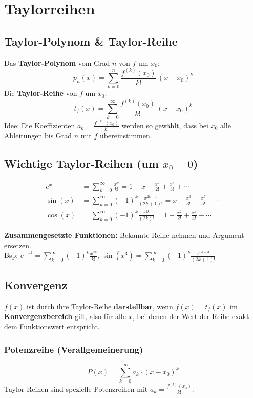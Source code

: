 \section{Taylorreihen}

\subsection{Taylor-Polynom \& Taylor-Reihe}
Das \textbf{Taylor-Polynom} vom Grad \(n\) von \(f\) um \(x_0\):
\[
    p_n(x) = \sum_{k=0}^{n} \frac{f^{(k)}(x_0)}{k!}\,(x-x_0)^k
\]
Die \textbf{Taylor-Reihe} von \(f\) um \(x_0\):
\[
    t_f(x) = \sum_{k=0}^{\infty} \frac{f^{(k)}(x_0)}{k!}\,(x-x_0)^k
\]
Idee: Die Koeffizienten \(a_k = \frac{f^{(k)}(x_0)}{k!}\) werden so gewählt, dass bei \(x_0\) alle Ableitungen bis Grad \(n\) mit \(f\) übereinstimmen.

\subsection{Wichtige Taylor-Reihen (um \texorpdfstring{$x_0=0$}{x0=0})}
\begin{align*}
    e^x     & = \sum_{k=0}^{\infty} \frac{x^k}{k!} = 1 + x + \frac{x^2}{2!} + \frac{x^3}{3!} + \cdots              \\
    \sin(x) & = \sum_{k=0}^{\infty} (-1)^k \frac{x^{2k+1}}{(2k+1)!} = x - \frac{x^3}{3!} + \frac{x^5}{5!} - \cdots \\
    \cos(x) & = \sum_{k=0}^{\infty} (-1)^k \frac{x^{2k}}{(2k)!} = 1 - \frac{x^2}{2!} + \frac{x^4}{4!} - \cdots
\end{align*}

\textbf{Zusammengesetzte Funktionen:} Bekannte Reihe nehmen und Argument ersetzen.\\
Bsp: \(e^{-x^2} = \sum_{k=0}^{\infty} (-1)^k \frac{x^{2k}}{k!}\), \enspace \(\sin(x^3) = \sum_{k=0}^{\infty} (-1)^k \frac{x^{6k+3}}{(2k+1)!}\)

\subsection{Konvergenz}
\(f(x)\) ist durch ihre Taylor-Reihe \textbf{darstellbar}, wenn \(f(x) = t_f(x)\) im \textbf{Konvergenzbereich} gilt, also für alle \(x\), bei denen der Wert der Reihe exakt dem Funktionswert entspricht.

\subsubsection{Potenzreihe (Verallgemeinerung)}
\[
    P(x) = \sum_{k=0}^{\infty} a_k \cdot (x-x_0)^k
\]
Taylor-Reihen sind spezielle Potenzreihen mit \(a_k = \frac{f^{(k)}(x_0)}{k!}\).

